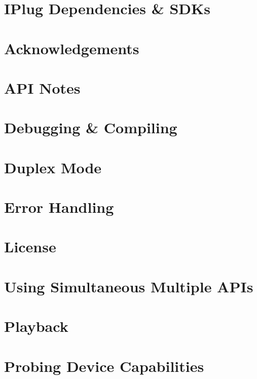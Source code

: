 \let\mypdfximage\pdfximage\def\pdfximage{\immediate\mypdfximage}\documentclass[twoside]{book}
\newcommand{\+}{\discretionary{\mbox{\scriptsize$\hookleftarrow$}}{}{}}
\begin{document}
\chapter{I\+Plug Dependencies \& S\+D\+Ks}
\label{md__c_1__users_fab_src__github_branches__neural_amp_modeler_plugin_i_plug2__dependencies__i_plug__r_e_a_d_m_e}

\chapter{Acknowledgements}
\label{acknowledge}

\chapter{A\+PI Notes}
\label{apinotes}

\chapter{Debugging \& Compiling}
\label{compiling}

\chapter{Duplex Mode}
\label{duplex}

\chapter{Error Handling}
\label{errors}

\chapter{License}
\label{license}

\chapter{Using Simultaneous Multiple A\+P\+Is}
\label{multi}

\chapter{Playback}
\label{playback}

\chapter{Probing Device Capabilities}
\label{probe}

\end{document}
